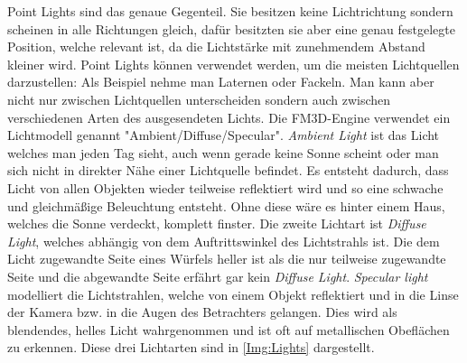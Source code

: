 Point Lights sind das genaue Gegenteil. Sie besitzen keine Lichtrichtung sondern scheinen in alle Richtungen gleich, dafür besitzten sie aber eine genau festgelegte Position, welche relevant ist, da die Lichtstärke mit zunehmendem Abstand kleiner wird. Point Lights können verwendet werden, um die meisten Lichtquellen darzustellen: Als Beispiel nehme man Laternen oder Fackeln. 
Man kann aber nicht nur zwischen Lichtquellen unterscheiden sondern auch zwischen verschiedenen Arten des ausgesendeten Lichts. Die FM3D-Engine verwendet ein Lichtmodell genannt "Ambient/Diffuse/Specular". \textit{Ambient Light} ist das Licht welches man jeden Tag sieht, auch wenn gerade keine Sonne scheint oder man sich nicht in direkter Nähe einer Lichtquelle befindet. Es entsteht dadurch, dass Licht von allen Objekten wieder teilweise reflektiert wird und so eine schwache und gleichmäßige Beleuchtung entsteht. Ohne diese wäre es hinter einem Haus, welches die Sonne verdeckt, komplett finster. 
Die zweite Lichtart ist \textit{Diffuse Light}, welches abhängig von dem Auftrittswinkel des Lichtstrahls ist. Die dem Licht zugewandte Seite eines Würfels heller ist als die nur teilweise zugewandte Seite und die abgewandte Seite erfährt gar kein \textit{Diffuse Light}. \textit{Specular light} modelliert die Lichtstrahlen, welche von einem Objekt reflektiert und in die Linse der Kamera bzw. in die Augen des Betrachters gelangen. Dies wird als blendendes, helles Licht wahrgenommen und ist oft auf metallischen Obeflächen zu erkennen. Diese drei Lichtarten sind in \cref{Img:Lights} dargestellt.

